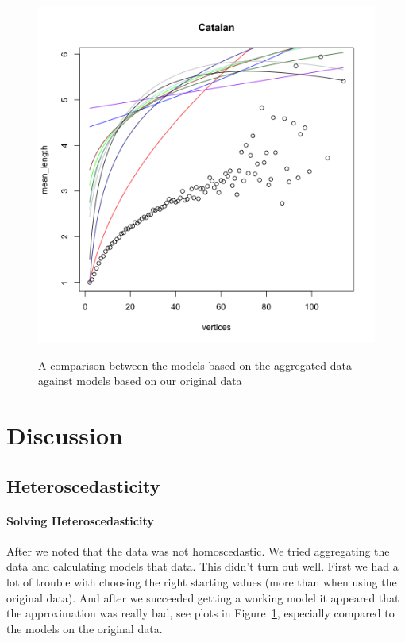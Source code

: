 \documentclass[paper=a4, fontsize=11pt]{scrartcl} %
\begin{document}
\begin{figure}
\begin{minipage}{\textwidth}
\begin{minipage}{.5\textwidth}
  \label{fig:cat3}
\end{minipage}%
\begin{minipage}{.5\textwidth}
  \centering
  \includegraphics[width=\linewidth]{Mean_Catalan4}
  \label{fig:cat4}
\end{minipage}
\end{minipage}
\caption{A comparison between the models based on the aggregated data against models based on our original data}\label{fig:compAgg}
\end{figure}


\newpage
\section{Discussion}
\subsection{Heteroscedasticity}

\paragraph{Solving Heteroscedasticity}
After we noted that the data was not homoscedastic. We tried aggregating the data and calculating models that data. This didn't turn out well. First we had a lot of trouble with choosing the right starting values (more than when using the original data). And after we succeeded getting a working model it appeared that the approximation was really bad, see plots in Figure~\ref{fig:compAgg}, especially compared to the models on the original data.\\
\end{document}

